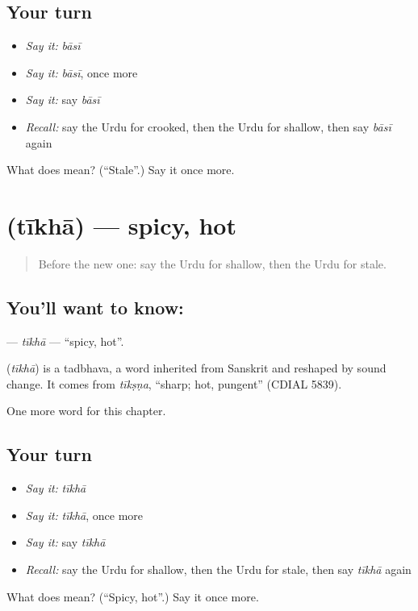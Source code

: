 \subsection*{Your turn}
\begin{itemize}
\raggedright
  \item \emph{Say it:} \emph{bāsī}
  \item \emph{Say it:} \emph{bāsī}, once more
  \item \emph{Say it:} say \emph{bāsī}
  \item \emph{Recall:} say the Urdu for crooked, then the Urdu for shallow, then say \emph{bāsī} again
\end{itemize}

\begin{tcolorbox}[breakable,colback=teal!4,colframe=teal!35!black,title={Before you move on}]
What does  mean? (\textquotedblleft{}Stale\textquotedblright{}.) Say it once more.
\end{tcolorbox}
\section[\texorpdfstring{\ur{تیکھا} (tīkhā)}{تیکھا (tīkhā)}]{ (tīkhā) — spicy, hot}

\label{lesson:UR-C194-tikha}



\begin{quote}
Before the new one: say the Urdu for shallow, then the Urdu for stale.
\end{quote}

\subsection*{You'll want to know: }
\textbf{} — \emph{tīkhā} — \textquotedblleft{}spicy, hot\textquotedblright{}.

\begin{cousinweb}
\textbf{} (\emph{tīkhā}) is a tadbhava, a word inherited from Sanskrit and reshaped by sound change. It comes from \emph{tīkṣṇa}, \textquotedblleft{}sharp; hot, pungent\textquotedblright{} (CDIAL 5839).
\end{cousinweb}

\begin{grammarlens}[title={What you've built}]
One more word for this chapter.
\end{grammarlens}

\subsection*{Your turn}
\begin{itemize}
\raggedright
  \item \emph{Say it:} \emph{tīkhā}
  \item \emph{Say it:} \emph{tīkhā}, once more
  \item \emph{Say it:} say \emph{tīkhā}
  \item \emph{Recall:} say the Urdu for shallow, then the Urdu for stale, then say \emph{tīkhā} again
\end{itemize}

\begin{tcolorbox}[breakable,colback=teal!4,colframe=teal!35!black,title={Before you move on}]
What does  mean? (\textquotedblleft{}Spicy, hot\textquotedblright{}.) Say it once more.
\end{tcolorbox}
